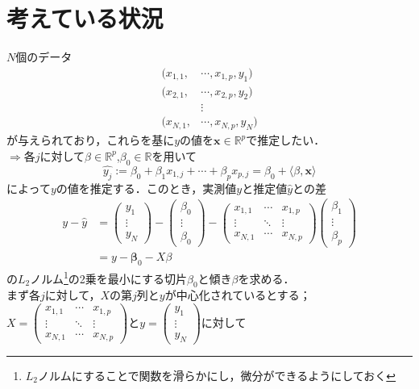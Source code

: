 \documentclass{jsarticle}
\theoremstyle{definition}
\begin{document}
\section*{考えている状況}
$N$個のデータ
\begin{align*}
(x_{1,1},&\cdots,x_{1,p},y_1)\\
(x_{2,1},&\cdots,x_{2,p},y_2)\\
&\vdots\\
(x_{N,1},&\cdots,x_{N,p},y_N)
\end{align*}
が与えられており，これらを基に$y$の値を${\bm x}\in\mathbb{R}^p$で推定したい．\\
$\Rightarrow $各$j$に対して$\beta\in\mathbb{R}^p$,$\beta_0\in\mathbb{R}$を用いて
$$\hat{y_j}:=\beta_0+\beta_1x_{1,j}+\cdots+\beta_px_{p,j}=\beta_0+\langle \beta,{\bm x} \rangle$$
によって$y$の値を推定する．このとき，実測値$y$と推定値$\hat{y}$との差
\begin{align*}
y-\hat{y}&=\left(
\begin{array}{c}
y_1\\
\vdots\\
y_N
\end{array}\right)-\left(\begin{array}{c}
\beta_0\\
\vdots\\
\beta_0
\end{array}\right)-\begin{pmatrix}
x_{1,1}&\cdots & x_{1,p}\\
\vdots & \ddots & \vdots\\
x_{N,1}& \cdots & x_{N,p}
\end{pmatrix}\left(\begin{array}{c}
\beta_1\\
\vdots\\
\beta_p
\end{array}\right)\\
&=y-{\bm \beta}_0-X\beta
\end{align*}
の$L_2$ノルム\footnote{$L_2$ノルムにすることで関数を滑らかにし，微分ができるようにしておく}の2乗を最小にする切片$\beta_0$と傾き$\beta$を求める．\\

まず各$j$に対して，$X$の第$j$列と$y$が中心化されているとする；\\
$X=\begin{pmatrix}
x_{1,1}&\cdots & x_{1,p}\\
\vdots & \ddots & \vdots\\
x_{N,1}& \cdots & x_{N,p}
\end{pmatrix}$と$y=\left(
\begin{array}{c}
y_1\\
\vdots\\
y_N
\end{array}\right)$に対して
\end{document}
